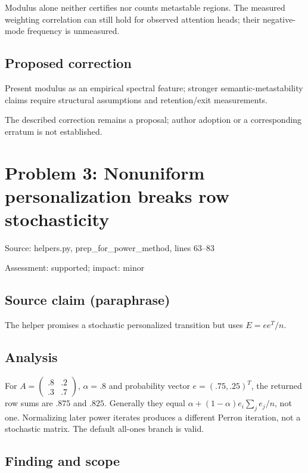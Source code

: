 \documentclass[11pt]{article}
\begin{document}
Modulus alone neither certifies nor counts metastable regions. The measured weighting correlation can still hold for observed attention heads; their negative-mode frequency is unmeasured.

\subsection*{Proposed correction}

Present modulus as an empirical spectral feature; stronger semantic-metastability claims require structural assumptions and retention/exit measurements.

The described correction remains a proposal; author adoption or a corresponding erratum is not established.

\section*{Problem 3: Nonuniform personalization breaks row stochasticity}

Source: helpers.py, prep\_for\_power\_method, lines 63–83

Assessment: supported; impact: minor

\subsection*{Source claim (paraphrase)}

The helper promises a stochastic personalized transition but uses \(E=ee^T/n\).

\subsection*{Analysis}

For \(A=\left(\begin{smallmatrix}.8&.2\\.3&.7\end{smallmatrix}\right)\), \(\alpha=.8\) and probability vector \(e=(.75,.25)^T\), the returned row sums are \(.875\) and \(.825\). Generally they equal \(\alpha+(1-\alpha)e_i\sum_je_j/n\), not one. Normalizing later power iterates produces a different Perron iteration, not a stochastic matrix. The default all-ones branch is valid.

\subsection*{Finding and scope}
\end{document}
